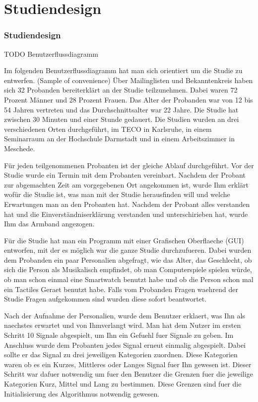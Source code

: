 
\chapter{Studiendesign}
\label{ch:Studiendesign}

\subsection{Studiendesign}
\label{ch:Evolutionärer Algorithmus:sec:Studiendesign}
TODO Benutzerflussdiagramm

Im folgenden Benutzerflussdiagramm hat man sich orientiert um die Studie zu entwerfen. (Sample of convenience) Über Mailinglisten und Bekanntenkreis haben sich 32 Probanden bereiterklärt an der Studie teilzunehmen. Dabei waren 72 Prozent Männer und 28 Prozent Frauen. Das Alter der Probanden war von 12 bis 54 Jahren vertreten und das Durchschnittsalter war 22 Jahre. Die Studie hat zwischen 30 Minuten und einer Stunde gedauert.
Die Studien wurden an drei verschiedenen Orten durchgeführt, im TECO in Karlsruhe, in einem Seminarraum an der Hochschule Darmstadt und in einem Arbeitszimmer in Meschede.

Für jeden teilgenommenen Probanten ist der gleiche Ablauf durchgeführt. 
Vor der Studie wurde ein Termin mit dem Probanten vereinbart. Nachdem der Probant zur abgemachten Zeit am vorgegebenen Ort angekommen ist, wurde Ihm erklärt wofür die Studie ist, was man mit der Studie herausfinden will und welche Erwartungen man an den Probanten hat. 
Nachdem der Probant alles verstanden hat und die Einverständniserklärung verstanden und unterschirieben hat, wurde Ihm das Armband angezogen. 

Für die Studie hat man ein Programm mit einer Grafischen Oberflaeche (GUI) entworfen, mit der es möglich war die ganze Studie durchzufueren. 
Dabei wurden dem Probanden ein paar Personalien abgefragt, wie das Alter, das Geschlecht, ob sich die Person als Musikalisch empfindet, ob man Computerspiele spielen würde, ob man schon einmal eine Smartwatch benutzt habe und ob die Person schon mal ein Tactiles Geraet benutzt habe. Falls vom Probanden Fragen waehrend der Studie Fragen aufgekommen sind wurden diese sofort beantwortet. 

Nach der Aufnahme der Personalien, wurde dem Benutzer erklaert, was Ihn als naechstes erwartet und von Ihmverlangt wird. 
Man hat dem Nutzer im ersten Schritt 10 Signale abgespielt, um Ihn ein Gefuehl fuer Signale zu geben. Im Anschluss wurde dem Probanten jedes Signal erneut einmalig abgespielt. Dabei sollte er das Signal zu drei jeweiligen Kategorien zuordnen. Diese Kategorien waren ob es ein Kurzes, Mittleres oder Langes Signal fuer Ihn gewesen ist. Dieser Schritt war dafuer notwendig um fuer den Benutzer die Grenzen fuer die jeweilige Kategorien Kurz, Mittel und Lang zu bestimmen. 
Diese Grenzen sind fuer die Initialisierung des Algorithmus notwendig gewesen. 

